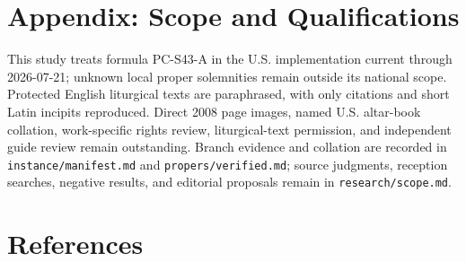 \section*{Appendix: Scope and Qualifications}

\begin{studyframe}
This study treats formula PC-S43-A in the U.S. implementation current through 2026-07-21; unknown local proper solemnities remain outside its national scope. Protected English liturgical texts are paraphrased, with only citations and short Latin incipits reproduced. Direct 2008 page images, named U.S. altar-book collation, work-specific rights review, liturgical-text permission, and independent guide review remain outstanding. Branch evidence and collation are recorded in \nolinkurl{instance/manifest.md} and \nolinkurl{propers/verified.md}; source judgments, reception searches, negative results, and editorial proposals remain in \nolinkurl{research/scope.md}.
\end{studyframe}

\section*{References}

